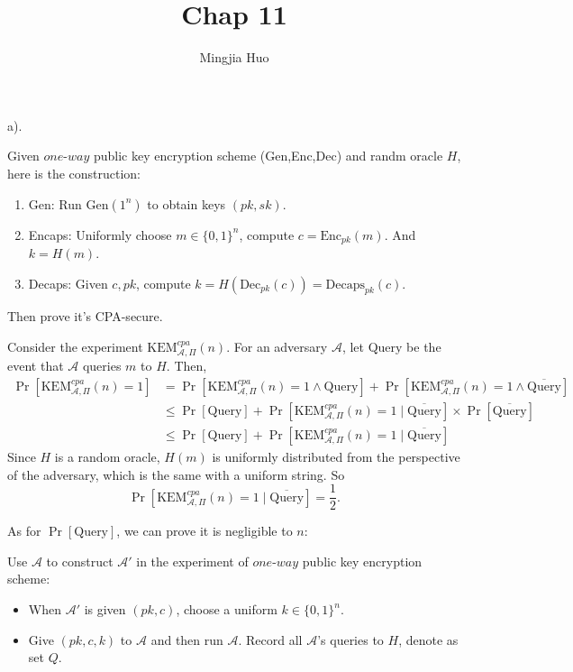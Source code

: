 \documentclass[a4paper]{article}
\newcommand{\Enc}{\text{Enc}}
\newcommand{\Dec}{\text{Dec}}
\newcommand{\Gen}{\text{Gen}}
\newcommand{\Query}{\text{Query}}
\newcommand{\Decaps}{\text{Decaps}}
\newcommand{\KEM}{\text{KEM}}
\newcommand{\A}{\mathcal{A}}
\newenvironment{problem}[2][Problem]{\begin{trivlist}
\item[\hskip \labelsep {\bfseries #1}\hskip \labelsep {\bfseries #2.}]}{\end{trivlist}}
\begin{document}
 
 
\title{Chap 11}
\author{Mingjia Huo}
\date{}
\maketitle

\begin{problem}{11.3}
(a).\par
Given $one$-$way$ public key encryption scheme (Gen,Enc,Dec) and randm oracle $H$, here is the construction:
\begin{enumerate}
    \item Gen: Run $\Gen(1^n)$ to obtain keys $(pk,sk)$.
    \item Encaps: Uniformly choose $m\in\{0,1\}^n$, compute $c=\Enc_{pk}(m)$. And $k=H(m)$.
    \item Decaps: Given $c,pk$, compute $k=H(\Dec_{pk}(c))=\Decaps_{pk}(c)$. 
\end{enumerate}\par
Then prove it's CPA-secure.\par
Consider the experiment $\KEM_{\A,\Pi}^{cpa}(n)$. For an adversary $\A$, let $\Query$ be the event that $\A$ queries $m$ to $H$. Then,
\begin{align*}
    \Pr[\KEM_{\A,\Pi}^{cpa}(n)=1]&=\Pr[\KEM_{\A,\Pi}^{cpa}(n)=1\land\Query]+\Pr[\KEM_{\A,\Pi}^{cpa}(n)=1\land\overline{\Query}]\\
    &\le \Pr[\Query]+\Pr[\KEM_{\A,\Pi}^{cpa}(n)=1\mid\overline{\Query}]\times\Pr[\overline{\Query}]\\
    &\le \Pr[\Query]+\Pr[\KEM_{\A,\Pi}^{cpa}(n)=1\mid\overline{\Query}]
\end{align*}
Since $H$ is a random oracle, $H(m)$ is uniformly distributed from the perspective of the adversary, which is the same with a uniform string. So
$$\Pr[\KEM_{\A,\Pi}^{cpa}(n)=1\mid\overline{\Query}]=\frac12.$$\par
As for $\Pr[\Query]$, we can prove it is negligible to $n$:\par
Use $\A$ to construct $\A'$ in the experiment of $one$-$way$ public key encryption scheme:
\begin{itemize}
    \item When $\A'$ is given $(pk,c)$, choose a uniform $k\in\{0,1\}^n$.
    \item Give $(pk,c,k)$ to $\A$ and then run $\A$. Record all $\A$'s queries to $H$, denote as set $Q$.

\end{itemize}
\end{problem}
\end{document}
